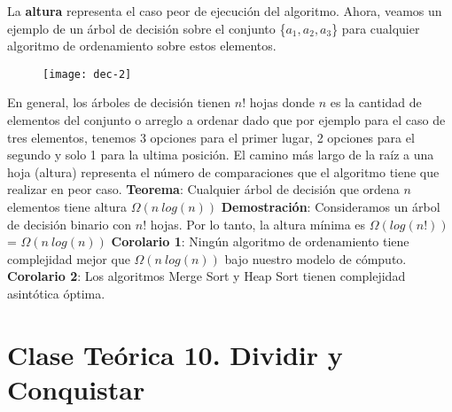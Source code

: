 \documentclass[10pt,a4paper]{article}
\begin{document}
\newline
\newline
La \textbf{altura} representa el caso peor de ejecución del algoritmo.
\newpage
Ahora, veamos un ejemplo de un árbol de decisión sobre el conjunto \{$a_{1},a_{2},a_{3}$\} para cualquier algoritmo de ordenamiento sobre estos elementos.
\newline
\newline
\begin{figure}[h]
	\centering
\texttt{[image: dec-2]}
	\label{drivers1}
\end{figure}
\newline
\newline
En general, los árboles de decisión tienen $n!$ hojas donde $n$ es la cantidad de elementos del conjunto o arreglo a ordenar dado que por ejemplo para el caso de tres elementos, tenemos 3 opciones para el primer lugar, 2 opciones para el segundo y solo 1 para la ultima posición.
\newline
\newline
El camino más largo de la raíz a una hoja (altura) representa el número de comparaciones que el algoritmo tiene que realizar en peor caso.
\newline
\newline
\textbf{Teorema}: Cualquier árbol de decisión que ordena $n$ elementos tiene altura $\Omega(n~log(n))$ 
\newline
\newline
\textbf{Demostración}: Consideramos un árbol de decisión binario con $n!$ hojas. Por lo tanto, la altura mínima es $\Omega(log(n!))$ = $\Omega(n~log(n))$ 
\newline
\newline
\textbf{Corolario 1}: Ningún algoritmo de ordenamiento tiene complejidad mejor que $\Omega(n~log(n))$ bajo nuestro modelo de cómputo.
\newline
\newline
\textbf{Corolario 2}: Los algoritmos Merge Sort y Heap Sort tienen complejidad asintótica óptima. 
\newpage

\section{Clase Teórica 10. Dividir y Conquistar }
\end{document}
